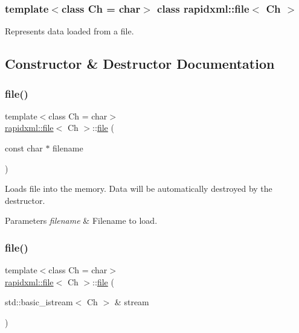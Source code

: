 \subsubsection*{template$<$class Ch = char$>$\newline
class rapidxml\+::file$<$ Ch $>$}

Represents data loaded from a file. 

\subsection{Constructor \& Destructor Documentation}
\mbox{\label{classrapidxml_1_1file_ae881a3cab1fe7152d45c92a8d7606cb3}} 
\subsubsection{\texorpdfstring{file()}{file()}\hspace{0.1cm}{\footnotesize\ttfamily [1/4]}}
{\footnotesize\ttfamily template$<$class Ch  = char$>$ \\
\mbox{\hyperlink{classrapidxml_1_1file}{rapidxml\+::file}}$<$ Ch $>$\+::\mbox{\hyperlink{classrapidxml_1_1file}{file}} (\begin{DoxyParamCaption}\item[{const char $\ast$}]{filename }\end{DoxyParamCaption})\hspace{0.3cm}{\ttfamily [inline]}}

Loads file into the memory. Data will be automatically destroyed by the destructor. 
\begin{DoxyParams}{Parameters}
{\em filename} & Filename to load. \\
\hline
\end{DoxyParams}
\mbox{\label{classrapidxml_1_1file_a90707ccd991cc392dcf4bef37eed9d1f}} 
\subsubsection{\texorpdfstring{file()}{file()}\hspace{0.1cm}{\footnotesize\ttfamily [2/4]}}
{\footnotesize\ttfamily template$<$class Ch  = char$>$ \\
\mbox{\hyperlink{classrapidxml_1_1file}{rapidxml\+::file}}$<$ Ch $>$\+::\mbox{\hyperlink{classrapidxml_1_1file}{file}} (\begin{DoxyParamCaption}\item[{std\+::basic\+\_\+istream$<$ Ch $>$ \&}]{stream }\end{DoxyParamCaption})\hspace{0.3cm}{\ttfamily [inline]}}

